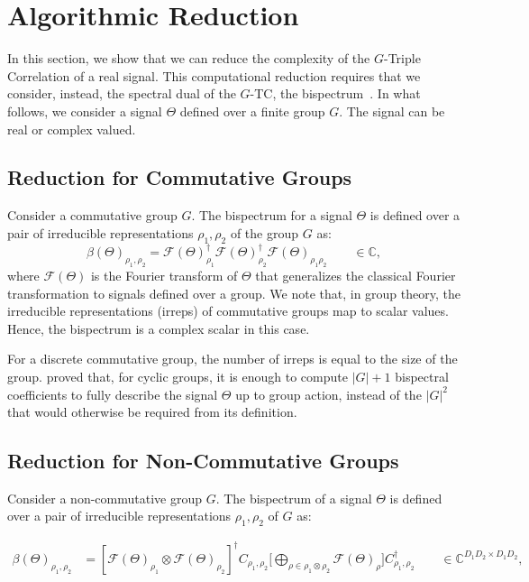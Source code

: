\section{Algorithmic Reduction}\label{app:reduction}

In this section, we show that we can reduce the complexity of the $G$-Triple Correlation of a real signal. This computational reduction requires that we consider, instead, the spectral dual of the $G$-TC, the bispectrum~\cite{kakarala2012bispectrum}. In what follows, we consider a signal $\Theta$ defined over a finite group $G$. The signal can be real or complex valued.

\subsection{Reduction for Commutative Groups}


Consider a commutative group $G$. The bispectrum for a signal $\Theta$ is defined over a pair of irreducible representations $\rho_1, \rho_2$ of the group $G$ as:
\begin{equation}
    \beta (\Theta)_{\rho_1, \rho_2} = \mathcal{F}(\Theta)_{\rho_1}^{\dagger}\mathcal{F}(\Theta)_{\rho_2}^{\dagger}\mathcal{F}(\Theta)_{\rho_1 \rho_2} \qquad \in \mathbb{C},
    \label{eqn:group-bs}
\end{equation}
where $\mathcal{F}(\Theta)$ is the Fourier transform of $\Theta$ that generalizes the classical Fourier transformation to signals defined over a group. We note that, in group theory, the irreducible representations (irreps) of commutative groups map to scalar values. Hence, the bispectrum is a complex scalar in this case.

For a discrete commutative group, the number of irreps is equal to the size of the group. \cite{KondorThesis} proved that, for cyclic groups, it is enough to compute $|G| + 1$ bispectral coefficients to fully describe the signal $\Theta$ up to group action, instead of the $|G|^2$ that would otherwise be required from its definition.

\subsection{Reduction for Non-Commutative Groups}

Consider a non-commutative group $G$. The bispectrum of a signal $\Theta$ is defined over a pair of irreducible representations $\rho_1, \rho_2$ of $G$ as:

\begin{align*}
   \beta (\Theta)_{\rho_1, \rho_2}
   &= [\mathcal{F}(\Theta)_{\rho_1} \otimes \mathcal{F}(\Theta)_{\rho_2}]^{\dagger}C_{\rho_1,\rho_2} \Big[ \bigoplus_{\rho \in \rho_1 \otimes \rho_2} \mathcal{F}(\Theta)_{\rho} \Big] C^{\dagger}_{\rho_1,\rho_2}
   \qquad \in \mathbb{C}^{D_1 D_2 \times D_1 D_2},
    \label{eqn:non-commutative-bs}
\end{align*}

